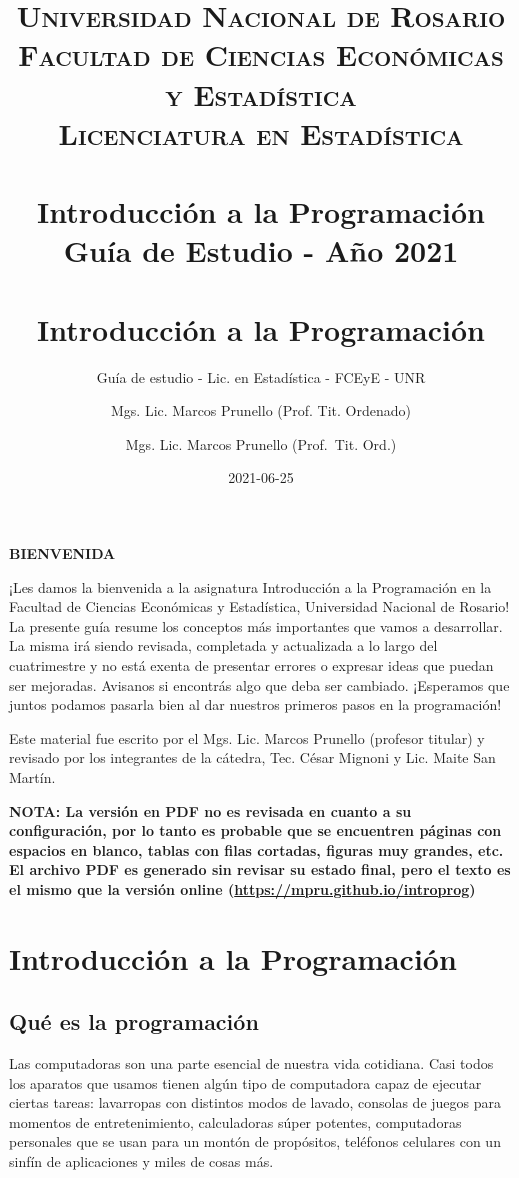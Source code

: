 \documentclass[
]{book}
\title{
	\usefont{OT1}{bch}{b}{n}
	\normalfont \normalsize
	\textsc{
		Universidad Nacional de Rosario \\
		Facultad de Ciencias Económicas y Estadística \\
		Licenciatura en Estadística
	} \\ [25pt]
	\horrule{2pt} \\[0.4cm]
	\huge \textbf{Introducción a la Programación} \\
	\bigbreak
	Guía de Estudio - Año 2021\\
	\horrule{2pt} \\[0.5cm]}
\author{
	\normalfont Mgs. Lic. Marcos Prunello (Prof. Tit. Ordenado)
}
\title{Introducción a la Programación}
\subtitle{Guía de estudio - Lic. en Estadística - FCEyE - UNR}
\author{Mgs. Lic. Marcos Prunello (Prof.~Tit. Ord.)}
\date{2021-06-25}
\begin{document}
\maketitle

{
\setcounter{tocdepth}{1}
\tableofcontents
}
\newpage

\textbf{BIENVENIDA}

\vspace{\baselineskip}

¡Les damos la bienvenida a la asignatura Introducción a la Programación en la Facultad de Ciencias Económicas y Estadística, Universidad Nacional de Rosario! La presente guía resume los conceptos más importantes que vamos a desarrollar. La misma irá siendo revisada, completada y actualizada a lo largo del cuatrimestre y no está exenta de presentar errores o expresar ideas que puedan ser mejoradas. Avisanos si encontrás algo que deba ser cambiado. ¡Esperamos que juntos podamos pasarla bien al dar nuestros primeros pasos en la programación!

\vspace{\baselineskip}

Este material fue escrito por el Mgs. Lic. Marcos Prunello (profesor titular) y revisado por los integrantes de la cátedra, Tec. César Mignoni y Lic. Maite San Martín.

\vspace{\baselineskip}

\textbf{NOTA: La versión en PDF no es revisada en cuanto a su configuración, por lo tanto es probable que se encuentren páginas con espacios en blanco, tablas con filas cortadas, figuras muy grandes, etc. El archivo PDF es generado sin revisar su estado final, pero el texto es el mismo que la versión online (\url{https://mpru.github.io/introprog})}

\hypertarget{introducciuxf3n-a-la-programaciuxf3n}{%
\chapter{Introducción a la Programación}\label{introducciuxf3n-a-la-programaciuxf3n}}

\hypertarget{quuxe9-es-la-programaciuxf3n}{%
\section{Qué es la programación}\label{quuxe9-es-la-programaciuxf3n}}

Las computadoras son una parte esencial de nuestra vida cotidiana. Casi todos los aparatos que usamos tienen algún tipo de computadora capaz de ejecutar ciertas tareas: lavarropas con distintos modos de lavado, consolas de juegos para momentos de entretenimiento, calculadoras súper potentes, computadoras personales que se usan para un montón de propósitos, teléfonos celulares con un sinfín de aplicaciones y miles de cosas más.
\end{document}
